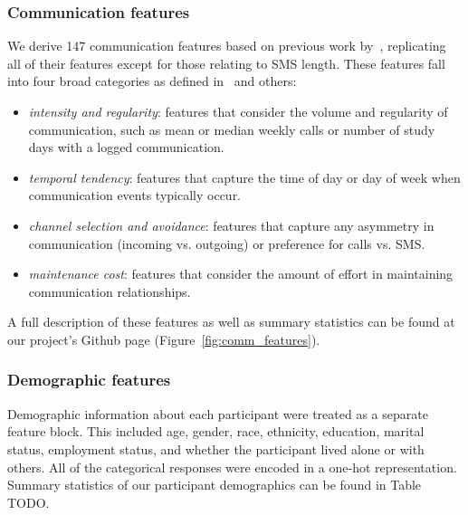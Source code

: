 \documentclass[acmlarge]{acmart}
\begin{document}
\subsubsection*{Communication features}

We derive 147 communication features based on previous work by~\cite{min2013mining}, replicating all of their features except for those relating to SMS length. These features fall into four broad categories as defined in~\cite{wiese2015you} and others:

\begin{itemize}
    \itemsep0em
    \item \textit{intensity and regularity}: features that consider the volume and regularity of communication, such as mean or median weekly calls or number of study days with a logged communication.
    \item \textit{temporal tendency}: features that capture the time of day or day of week when communication events typically occur.
    \item \textit{channel selection and avoidance}: features that capture any asymmetry in communication (incoming vs. outgoing) or preference for calls vs. SMS.
    \item \textit{maintenance cost}: features that consider the amount of effort in maintaining communication relationships.
\end{itemize}

A full description of these features as well as summary statistics can be found at our project's Github page (Figure~\ref{fig:comm_features}).




\subsubsection*{Demographic features}

Demographic information about each participant were treated as a separate feature block. This included age, gender, race, ethnicity, education, marital status, employment status, and whether the participant lived alone or with others. All of the categorical responses were encoded in a one-hot representation. Summary statistics of our participant demographics can be found in Table TODO.
\end{document}
